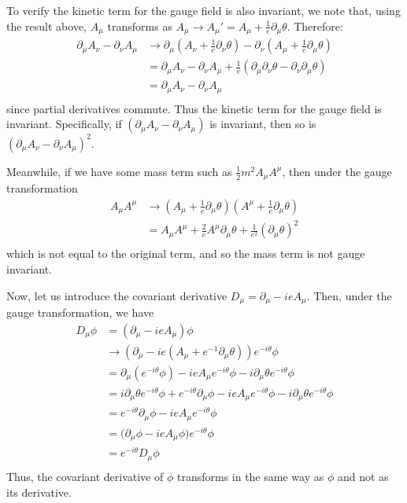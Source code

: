 \documentclass[12pt]{article}
\newcommand{\delmu}{\partial_{\mu}}
\newcommand{\delnu}{\partial_{\nu}}
\newcommand{\+}{\dagger}
\begin{document}
To verify the kinetic term for the gauge field is also invariant, we note that,  using
the result above, $A_{\mu}$ transforms as $A_{\mu} \to A_{\mu}' = A_{\mu} +
\frac{1}{e}\delmu\theta$. Therefore:
\begin{align*}
    \delmu A_{\nu}  -  \delnu A_{\mu} &\to  \delmu (A_{\nu} + \frac{1}{e}\delnu\theta) -
    \delnu (A_{\mu} + \frac{1}{e}\delmu\theta) \\
    &= \delmu A_{\nu} - \delnu A_{\mu} + \frac{1}{e}(\delmu\delnu\theta - \delnu\delmu\theta) \\
    &= \delmu A_{\nu} - \delnu A_{\mu} \\
\end{align*}
since partial derivatives commute. Thus the kinetic term for the gauge field is invariant. Specifically,
if $\left(\delmu A_{\nu}  -  \delnu A_{\mu}\right)$ is invariant, then so is 
$\left(\delmu A_{\nu}  -  \delnu A_{\mu}\right)^2$.

Meanwhile, if we have some mass term such as $\frac{1}{2}m^2 A_{\mu}A^{\mu}$,
then under the gauge transformation
\begin{align*}
    A_{\mu}A^{\mu} &\to (A_{\mu} + \frac{1}{e}\delmu\theta)(A^{\mu} +
    \frac{1}{e}\delmu\theta) \\
                   &= A_{\mu}A^{\mu} + \frac{2}{e}A^{\mu}\delmu\theta +
                   \frac{1}{e^2}(\delmu\theta)^2 \\
\end{align*}
which is not equal to the original term, and so the mass term is not gauge invariant.

Now, let us introduce the covariant derivative $D_{\mu} = \delmu - ieA_{\mu}$. Then,
under the gauge transformation, we have
\begin{align*}
    D_{\mu}\phi &= (\delmu - ieA_{\mu})\phi \\
                &\to (\delmu - ie(A_{\mu} + e^{-1}\delmu\theta))e^{-i\theta}\phi \\
                &= \delmu(e^{-i\theta}\phi) - ieA_{\mu}e^{-i\theta}\phi - i\delmu\theta e^{-i\theta}\phi \\
                &= i\delmu\theta e^{-i\theta}\phi + e^{-i\theta}\delmu\phi -
                ieA_{\mu}e^{-i\theta}\phi - i\delmu\theta e^{-i\theta}\phi \\
                &=  e^{-i\theta}\delmu\phi - ieA_{\mu}e^{-i\theta}\phi \\
                &=  \big(\delmu\phi - ieA_{\mu}\phi \big)e^{-i\theta}\phi \\
                &=  e^{-i\theta}D_{\mu}\phi \\
\end{align*}
Thus, the covariant derivative of $\phi$ transforms in the same way as $\phi$ and not
as its derivative.
\end{document}
